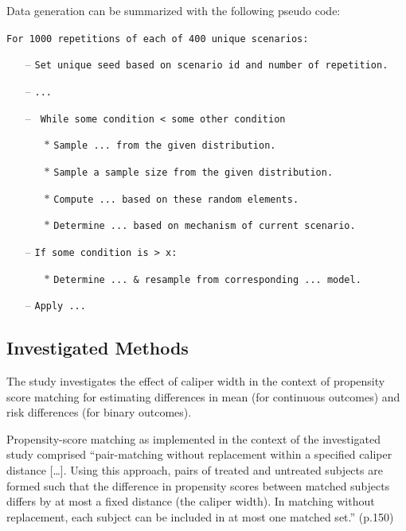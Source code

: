 \documentclass[10,a4paperpaper,]{article}
\begin{document}
\begin{minipage}{\linewidth}
Data generation can be summarized with the following pseudo code:

\texttt{For 1000 repetitions of each of 400 unique scenarios:}
\begin{itemize}[leftmargin=*] 
    \item[--] \texttt{Set unique seed based on scenario id and number of repetition.}
    \item[--] \texttt{...}
    \item[--] \texttt{ While some condition < some other condition}
    \begin{itemize}
      \item[$\ast$] \texttt{Sample ... from the given distribution.}
      \item[$\ast$] \texttt{Sample a sample size from the given distribution.}
      \item[$\ast$] \texttt{Compute ... based on these random elements.}
      \item[$\ast$] \texttt{Determine ... based on mechanism of current scenario.}
    \end{itemize}
    \item[--] \texttt{If some condition is > x:}
    \begin{itemize}
      \item[$\ast$] \texttt{Determine ... \& resample from corresponding ... model.}
    \end{itemize}
    \item[--] \texttt{Apply ...}
\end{itemize}
\end{minipage}
\newpage

\FloatBarrier 

\subsection{Investigated Methods}

The study investigates the effect of caliper width in the context of
propensity score matching for estimating differences in mean (for
continuous outcomes) and risk differences (for binary outcomes).

Propensity-score matching as implemented in the context of the
investigated study comprised ``pair-matching without replacement within
a specified caliper distance {[}\ldots{]}. Using this approach, pairs of
treated and untreated subjects are formed such that the difference in
propensity scores between matched subjects differs by at most a fixed
distance (the caliper width). In matching without replacement, each
subject can be included in at most one matched set.'' (p.150)
\end{document}
